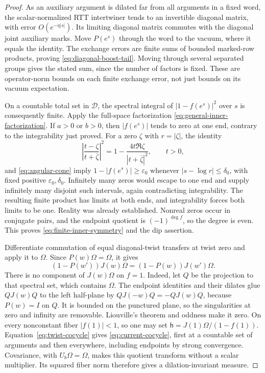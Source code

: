 \begin{proof}
As an auxiliary argument is dilated far from all arguments in a fixed
word, the scalar-normalized RTT intertwiner tends to an invertible
diagonal matrix, with error $O(e^{-\eta|s|})$.  Its limiting diagonal
matrix commutes with the diagonal joint auxiliary marks.  Move $P(e^s)$
through the word to the vacuum, where it equals the identity.  The
exchange errors are finite sums of bounded marked-row products, proving
\eqref{eq:diagonal-boost-tail}.  Moving through several separated groups
gives the stated sum, since the number of factors is fixed.  These are
operator-norm bounds on each finite exchange error, not just bounds on
its vacuum expectation.

On a countable total set in $\mathcal D$, the spectral integral of
$|1-f(e^s)|^2$ over $s$ is consequently finite.  Apply the full-space factorization \eqref{eq:general-inner-factorization}.
If $a>0$ or $b>0$, then $|f(e^s)|$ tends to zero at one end, contrary
to the integrability just proved.  For a zero $\zeta$ with
$r=|\zeta|$, the identity
\[
 \left|\frac{t-\zeta}{t+\overline\zeta}\right|^2
 =1-\frac{4t\Re\zeta}{|t+\overline\zeta|^2},\qquad t>0,
\]
and \eqref{eq:angular-cone} imply
$1-|f(e^s)|\ge\varepsilon_0$ whenever
$|s-\log r|\le\delta_0$, with fixed positive
$\varepsilon_0,\delta_0$.  Infinitely many zeros would escape to one
end and supply infinitely many disjoint such intervals, again
contradicting integrability.  The resulting finite product has limits
at both ends, and integrability forces both limits to be one.
Reality was already established.  Nonreal zeros occur in conjugate
pairs, and the endpoint quotient is $(-1)^{\deg f}$, so the degree is
even.  This proves \eqref{eq:finite-inner-symmetry} and the dip assertion.

Differentiate commutation of equal diagonal-twist transfers at twist
zero and apply it to $\Omega$.  Since $P(w)\Omega=\Omega$, it gives
\begin{equation}\label{eq:twist-cocycle}
 (1-P(w'))J(w)\Omega=(1-P(w))J(w')\Omega.
\end{equation}
There is no component of $J(w)\Omega$ on $f=1$.  Indeed, let $Q$ be
the projection to that spectral set, which contains $\Omega$.
The endpoint identities and their dilates glue $QJ(w)Q$ to the left
half-plane by $QJ(-w)Q=-QJ(w)Q$, because $P(w)=I$ on $Q$.
It is bounded on the punctured plane, so the singularities at zero
and infinity are removable.  Liouville's theorem and oddness make it
zero.  On every
nonconstant fiber $|f(1)|<1$, so one may set
$\mathsf h=J(1)\Omega/(1-f(1))$.  Equation~\eqref{eq:twist-cocycle}
gives \eqref{eq:current-cocycle}, first at a countable set of arguments
and then everywhere, including endpoints by strong convergence.
Covariance, with $U_b\Omega=\Omega$, makes this quotient transform
without a scalar multiplier.  Its squared fiber norm therefore gives
a dilation-invariant measure.


\end{proof}
